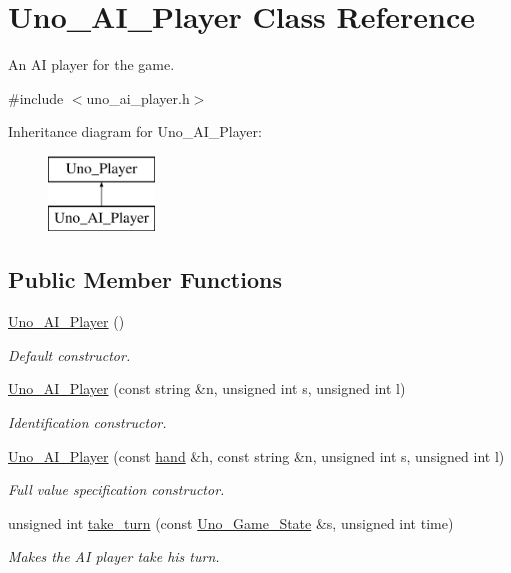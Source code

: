 \hypertarget{class_uno___a_i___player}{
\section{\-Uno\-\_\-\-A\-I\-\_\-\-Player \-Class \-Reference}
\label{class_uno___a_i___player}
}


\-An \-A\-I player for the game.  




{\ttfamily \#include $<$uno\-\_\-ai\-\_\-player.\-h$>$}

\-Inheritance diagram for \-Uno\-\_\-\-A\-I\-\_\-\-Player\-:\begin{figure}[H]
\begin{center}
\leavevmode
\includegraphics[height=2.000000cm]{class_uno___a_i___player}
\end{center}
\end{figure}
\subsection*{\-Public \-Member \-Functions}
\begin{DoxyCompactItemize}
\item 
\hyperlink{class_uno___a_i___player_ae977868f52c315663174b5c4943ac9ef}{\-Uno\-\_\-\-A\-I\-\_\-\-Player} ()
\begin{DoxyCompactList}\small\item\em \-Default constructor. \end{DoxyCompactList}\item 
\hyperlink{class_uno___a_i___player_ab16352005d98a759d298d05afdaaea9e}{\-Uno\-\_\-\-A\-I\-\_\-\-Player} (const string \&n, unsigned int s, unsigned int l)
\begin{DoxyCompactList}\small\item\em \-Identification constructor. \end{DoxyCompactList}\item 
\hyperlink{class_uno___a_i___player_a535884ee15f0d243b43227d941a102c8}{\-Uno\-\_\-\-A\-I\-\_\-\-Player} (const \hyperlink{uno__player_8h_acd9523c15e47a87e3740cf5ade73556e}{hand} \&h, const string \&n, unsigned int s, unsigned int l)
\begin{DoxyCompactList}\small\item\em \-Full value specification constructor. \end{DoxyCompactList}\item 
unsigned int \hyperlink{class_uno___a_i___player_a7884d5ed5f3fbbfc2ca7976ce252f333}{take\-\_\-turn} (const \hyperlink{class_uno___game___state}{\-Uno\-\_\-\-Game\-\_\-\-State} \&s, unsigned int time)
\begin{DoxyCompactList}\small\item\em \-Makes the \-A\-I player take his turn. \end{DoxyCompactList}\end{DoxyCompactItemize}
